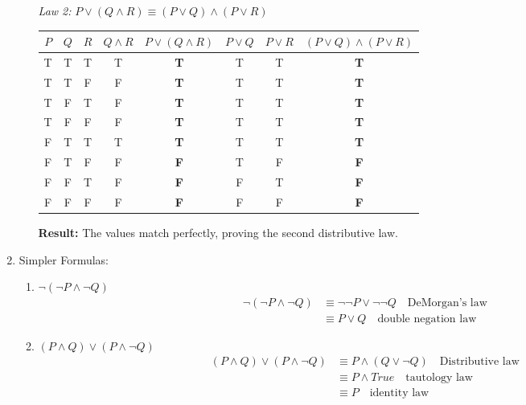\begin{enumerate}
\begin{enumerate}
    \textit{Law 2:} $P \lor (Q \land R) \equiv (P \lor Q) \land (P \lor R)$
    \begin{center}
      \begin{tabular}{cccccccc}
        $P$ & $Q$ & $R$ & $Q \land R$ & $P \lor (Q \land R)$ & $P \lor Q$ & $P \lor R$ & $(P \lor Q) \land (P \lor R)$ \\
        \midrule
        T & T & T & T & \textbf{T} & T & T & \textbf{T} \\
        T & T & F & F & \textbf{T} & T & T & \textbf{T} \\
        T & F & T & F & \textbf{T} & T & T & \textbf{T} \\
        T & F & F & F & \textbf{T} & T & T & \textbf{T} \\
        F & T & T & T & \textbf{T} & T & T & \textbf{T} \\
        F & T & F & F & \textbf{F} & T & F & \textbf{F} \\
        F & F & T & F & \textbf{F} & F & T & \textbf{F} \\
        F & F & F & F & \textbf{F} & F & F & \textbf{F}
      \end{tabular}
    \end{center}
    \textbf{Result:} The values match perfectly, proving the second distributive law.
  \end{enumerate}

\item Simpler Formulas:
  \begin{enumerate}
  \item $\neg (\neg P \land \neg Q)$ 
    \begin{align*}
      \neg (\neg P \land \neg Q) &\equiv \neg \neg P \lor \neg \neg Q \quad \text{DeMorgan's law} \\ 
      &\equiv P \lor Q \quad \text{double negation law}
    \end{align*}

  \item $(P \land Q) \lor (P \land \neg Q)$ \\
    \begin{align*}
      (P \land Q) \lor (P \land \neg Q) &\equiv P \land (Q \lor \neg Q) \quad \text{Distributive law} \\
      &\equiv P \land True \quad \text{tautology law} \\
      &\equiv P \quad \text{identity law}
    \end{align*}


\end{enumerate}
\end{enumerate}
